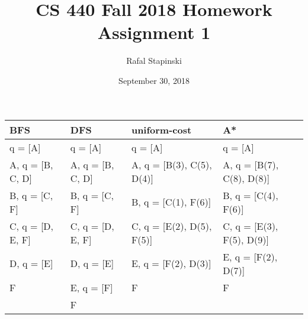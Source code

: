 \documentclass[a4paper]{article}
\title{CS 440 Fall 2018 Homework Assignment 1}
\author{Rafal Stapinski}
\date{September 30, 2018}
\begin{document}
\maketitle


\section{}
\begin{table}[h]
\begin{tabular}{|l|l|l|l|}
\hline
BFS                  & DFS                  & uniform-cost                  & A*                            \\ \hline
q = {[}A{]}          & q = {[}A{]}          & q = {[}A{]}                   & q = {[}A{]}                   \\ \hline
A, q = {[}B, C, D{]} & A, q = {[}B, C, D{]} & A, q = {[}B(3), C(5), D(4){]} & A, q = {[}B(7), C(8), D(8){]} \\ \hline
B, q = {[}C, F{]}    & B, q = {[}C, F{]}    & B, q = {[}C(1), F(6){]}       & B, q = {[}C(4), F(6){]}       \\ \hline
C, q = {[}D, E, F{]} & C, q = {[}D, E, F{]} & C, q = {[}E(2), D(5), F(5){]} & C, q = {[}E(3), F(5), D(9){]} \\ \hline
D, q = {[}E{]}       & D, q = {[}E{]}       & E, q = {[}F(2), D(3){]}       & E, q = {[}F(2), D(7){]}       \\ \hline
F                    & E, q = {[}F{]}       & F                             & F                             \\ \hline
                     & F                    &                               &                               \\ \hline
\end{tabular}
\end{table}

\section{}
\end{document}

